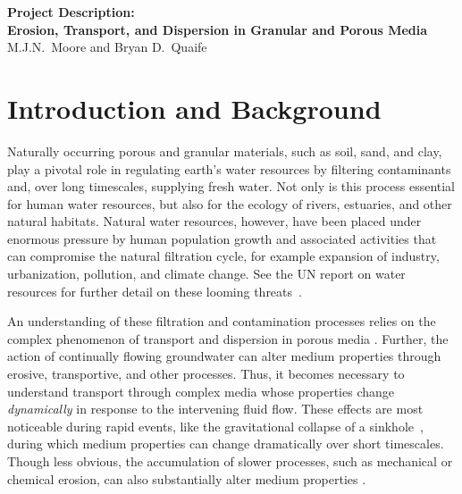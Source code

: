 \documentclass[11pt]{article}
\begin{document}
\begin{center}
{\large \bf Project Description: \\
Erosion, Transport, and Dispersion in Granular
and Porous Media} 
\\
M.J.N.~Moore and Bryan D.~Quaife
\end{center}


\section{Introduction and Background}
Naturally occurring porous and granular materials, such as soil, sand, and clay, play a pivotal role in regulating earth's water resources by filtering contaminants and, over long timescales, supplying fresh water.  Not only is this process essential for human water resources, but also for the ecology of rivers, estuaries, and other natural habitats.  Natural water resources, however, have been placed under enormous pressure by human population growth and associated activities that can compromise the natural filtration cycle, for example expansion of industry, urbanization, pollution, and climate change. See the UN report on water resources for further detail on these looming threats~\cite{UNwater}.

An understanding of these filtration and contamination processes relies
on the complex phenomenon of transport and dispersion in porous media
\cite{scheidegger1961general, neuman1987stochastic,
delgado2007longitudinal, zhang2016backward}. Further, the action of
continually flowing groundwater can alter medium properties through
erosive, transportive, and other processes. Thus, it becomes necessary
to understand transport through complex media whose properties change
{\em dynamically} in response to the intervening fluid flow. These
effects are most noticeable during rapid events, like the gravitational
collapse of a sinkhole~\cite{sandhu2018fate}, during which medium
properties can change dramatically over short timescales. Though less
obvious, the accumulation of slower processes, such as mechanical or chemical erosion, can also substantially alter medium properties \cite{szymczak2009wormhole, ellis2013dissolution}.  
\end{document}
